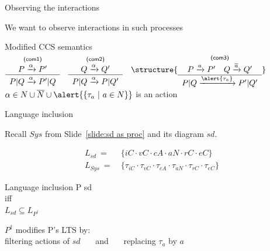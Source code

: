 \documentclass[aspectratio=169]{beamer}
\begin{document}
\begin{slide}{Observing the interactions}

  \centering

  We want to \alert{observe} interactions in such processes

  \begin{block}{Modified CCS semantics}
    \centering
    $
      \typerule{com1}{P\trans\alpha P'}{P|Q\trans\alpha P'|Q}
      ~~~
      \typerule{com2}{Q\trans\alpha Q'}{P|Q\trans\alpha P|Q'}
      ~~~
      \structure{
      \typerule{com3}{P\trans a P' \quad Q\trans{\ainv{a}} Q'}{P|Q\trans{\alert{\tau_a}} P'|Q'}
      }
    $
    \\[5mm]
    $\alpha \in N \cup \overline{N} \cup \alert{\{\tau_a ~|~ a\in N\}}$ is an action

  \end{block}
\end{slide}


\begin{slide}{Language inclusion}
  \centering

  Recall $Sys$ from Slide~\ref{slide:sd as proc} and its diagram $sd$.

  \begin{align*}
    L_{sd} ~=~& \{iC\cdot vC\cdot cA\cdot aN\cdot rC\cdot eC\}
    \\
    L_{Sys} ~=~& \{\tau_{iC}\cdot\tau_{vC}\cdot\tau_{cA}\cdot\tau_{aN}\cdot\tau_{rC}\cdot\tau_{eC}\}
  \end{align*}
  

  \begin{block}{Language inclusion}
    \centering
    P  sd \\\alert{iff}\\
      $L_{sd} \subseteq L_{P^{\dagger}}$
  \end{block}

  $P^{\dagger}$ modifies P's LTS by:\\filtering actions of $sd$ ~~~and~~~ replacing $\tau_a$ by $a$

\end{slide}
\end{document}
